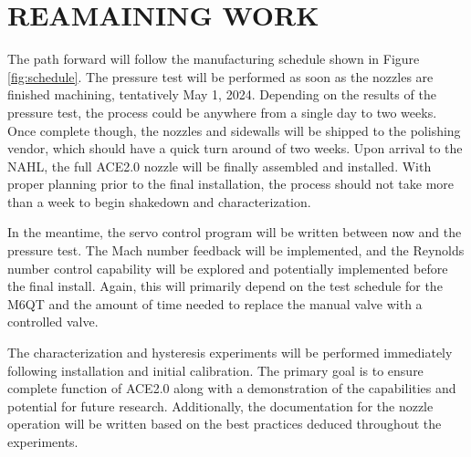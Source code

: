 %
%  
%

\chapter{REAMAINING WORK}

The path forward will follow the manufacturing schedule shown in Figure \ref{fig:schedule}. The pressure test will be performed as soon as the nozzles are finished machining, tentatively May 1, 2024. Depending on the results of the pressure test, the process could be anywhere from a single day to two weeks. Once complete though, the nozzles and sidewalls will be shipped to the polishing vendor, which should have a quick turn around of two weeks. Upon arrival to the NAHL, the full ACE2.0 nozzle will be finally assembled and installed. With proper planning prior to the final installation, the process should not take more than a week to begin shakedown and characterization.

In the meantime, the servo control program will be written between now and the pressure test. The Mach number feedback will be implemented, and the Reynolds number control capability will be explored and potentially implemented before the final install. Again, this will primarily depend on the test schedule for the M6QT and the amount of time needed to replace the manual valve with a controlled valve. 

The characterization and hysteresis experiments will be performed immediately following installation and initial calibration. The primary goal is to ensure complete function of ACE2.0 along with a demonstration of the capabilities and potential for future research. Additionally, the documentation for the nozzle operation will be written based on the best practices deduced throughout the experiments.


\nocite{aiaa-uncertainty-standard}
\nocite{anderson-fundamentals}
\nocite{anderson-compressible}

